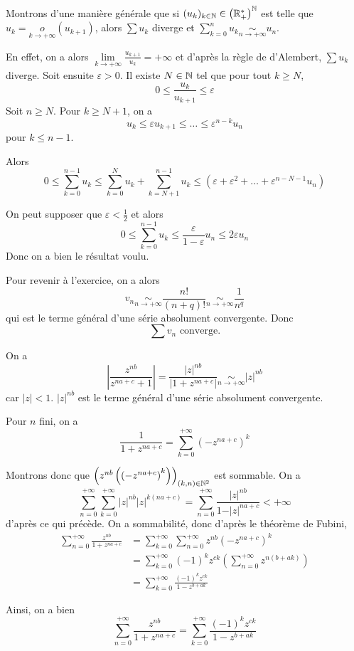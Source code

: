 \begin{solution}
	Montrons d'une manière générale que si $(u_{k})_{k\in\mathbb{N}}\in\left(\mathbb{R}_{+}^{*}\right)^{\mathbb{N}}$ est telle que $u_{k}=\underset{k\to+\infty}{o}(u_{k+1})$, alors $\sum u_{k}$ diverge et $\sum_{k=0}^{n}u_{k}\underset{n\to+\infty}{\sim}u_{n}$.

	En effet, on a alors $\lim\limits_{k\to+\infty}\frac{u_{k+1}}{u_{k}}=+\infty$ et d'après la règle de d'Alembert, $\sum u_{k}$ diverge. Soit ensuite $\varepsilon>0$. Il existe $N\in\mathbb{N}$ tel que pour tout $k\geqslant N$, 
	$$0\leqslant \frac{u_{k}}{u_{k+1}}\leqslant\varepsilon$$
	Soit $n\geqslant N$. Pour $k\geqslant N+1$, on a 
	$$u_{k}\leqslant \varepsilon u_{k+1}\leqslant\dots\leqslant \varepsilon^{n-k}u_{n}$$
	pour $k\leqslant n-1$.

	Alors 
	$$0\leqslant\sum_{k=0}^{n-1}u_{k}\leqslant\sum_{k=0}^{N}u_{k}+\sum_{k=N+1}^{n-1}u_{k}\leqslant\left(\varepsilon+\varepsilon^{2}+\dots+\varepsilon^{n-N-1}u_{n}\right)$$

	On peut supposer que $\varepsilon<\frac{1}{2}$ et alors 
	$$0\leqslant\sum_{k=0}^{n-1}u_{k}\leqslant\frac{\varepsilon}{1-\varepsilon}u_{n}\leqslant2\varepsilon u_{n}$$
	Donc on a bien le résultat voulu.

	Pour revenir à l'exercice, on a alors 
	$$v_{n}\underset{n\to+\infty}{\sim}\frac{n!}{(n+q)!}\underset{n\to+\infty}{\sim}\frac{1}{n^{q}}$$
	qui est le terme général d'une série absolument convergente.
	Donc 
	$$\boxed{\sum v_{n}\text{ converge.}}$$
\end{solution}

\begin{solution}
	On a 
	$$\left\vert\frac{z^{nb}}{z^{na+c}+1}\right\vert=\frac{\left\vert z\right\vert^{nb}}{\left\vert1+z^{na+c}\right\vert}\underset{n\to+\infty}{\sim}\left\vert z\right\vert^{nb}$$
	car $\vert z\vert<1$. $\vert z\vert^{nb}$ est le terme général d'une série absolument convergente.

	Pour $n$ fini, on a 
	$$\frac{1}{1+z^{na+c}}=\sum_{k=0}^{+\infty}(-z^{na+c})^{k}$$

	Montrons donc que $\left(z^{nb}\left(\left(-z^{na+c}\right)^{k}\right)\right)_{(k,n)\in\mathbb{N}^{2}}$ est sommable. On a 
	$$\sum_{n=0}^{+\infty}\sum_{k=0}^{+\infty}\vert z\vert^{nb}\vert z\vert^{k(na+c)}=\sum_{n=0}^{+\infty}\frac{\vert z\vert^{nb}}{1-\vert z\vert^{na+c}}<+\infty$$
	d'après ce qui précède. On a sommabilité, donc d'après le théorème de Fubini,
	\begin{align*}
		\sum_{n=0}^{+\infty}\frac{z^{nb}}{1+z^{na+c}}
		&=\sum_{k=0}^{+\infty}\sum_{n=0}^{+\infty}z^{nb}(-z^{na+c})^{k}\\
		&=\sum_{k=0}^{+\infty}(-1)^{k}z^{ck}\left(\sum_{n=0}^{+\infty}z^{n(b+ak)}\right)\\
		&=\sum_{k=0}^{+\infty}\frac{(-1)^{k}z^{ck}}{1-z^{b+ak}}
	\end{align*}

	Ainsi, on a bien 
	$$\boxed{\sum_{n=0}^{+\infty}\frac{z^{nb}}{1+z^{na+c}}=\sum_{k=0}^{+\infty}\frac{(-1)^{k}z^{ck}}{1-z^{b+ak}}}$$
\end{solution}

